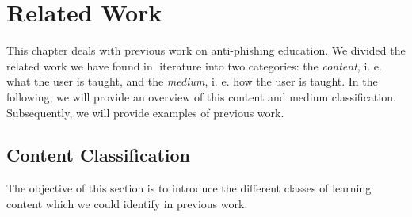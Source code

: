 
\section{Related Work}
\label{s:related_work}

This chapter deals with previous work on anti-phishing education.
 We divided the related work we have found in literature into two categories: the \textit{content}, i.
e.
 what the user is taught, and the 
\textit{medium}, i.
e.
 how the user is taught.
 In the following, we will provide an overview of this content and medium classification.
 Subsequently, we will provide examples of previous work.


\subsection{Content Classification}
The objective of this section is to introduce the different classes of learning content which we could identify in previous work.

